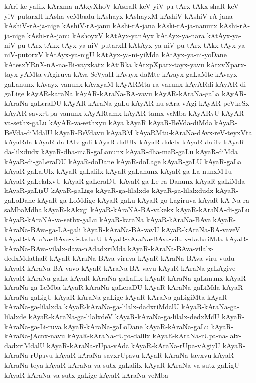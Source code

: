 {kAri-ke-yalilx
kArxma-nAtxyXhoV
kAshaR-keV-yiV-pu-tArx-tAkx-shaR-keV-yiV-putarxH
kAsha-veMbudu
kAshayx
kAshayxM
kAshiV
kAshiV-rA-jana
kAshiV-rA-ja-nige
kAshiV-rA-janu
kAshi-rA-jana
kAshi-rA-ja-nanunx
kAshi-rA-ja-nige
kAshi-rA-janu
kAshoyxV
kAtAyx-yanAyx
kAtAyx-ya-nara
kAtAyx-ya-niV-pu-tArx-tAkx-tAyx-ya-niV-putarxH
kAtAyx-ya-niV-pu-tArx-tAkx-tAyx-ya-niV-putorxV
kAtAyx-ya-nigU
kAtAyx-ya-ni-yiMda
kAtAyx-ya-ni-yoDane
kAtesxYRnX-nA-na-Bi-vayxkatx
kAtiRka
kAtxpXparx-tayx-yavu
kAtxvXparx-tayx-yAMta-vAgiruva
kAva-SeVyaH
kAvayx-daMte
kAvayx-gaLaMte
kAvayx-gaLanunx
kAvayx-vanunx
kAvxyaM
kAyARMta-ra-vanunx
kAyARdi
kAyAR-di-gaLige
kAyAR-karaNa
kAyAR-kAraNa-BA-vavu
kAyAR-kAraNa-gaLa
kAyAR-kAraNa-gaLeraDU
kAyAR-kAraNa-gaLu
kAyAR-nu-sAra-vAgi
kAyAR-peVkeSx
kAyAR-savxrUpa-vanunx
kAyARtamx
kAyAR-tamx-veMba
kAyARvU
kAyAR-va-sethx-gaLu
kAyAR-va-sethxyu
kAya
kAyaR
kAyaR-BeVda-diMda
kAyaR-BeVda-diMdalU
kAyaR-BeVdavu
kAyaRM
kAyaRMtu-kAraNa-dAvx-reV-teyxVta
kAyaRda
kAyaR-da-lAlx-gali
kAyaR-dalUlx
kAyaR-dalelx
kAyaR-dalilx
kAyaR-da-lilxdudx
kAyaR-dha-maR-gaLanunx
kAyaR-dha-maR-gaLu
kAyaR-diMda
kAyaR-di-gaLeraDU
kAyaR-doDane
kAyaR-doLage
kAyaR-gaLU
kAyaR-gaLa
kAyaR-gaLalUlx
kAyaR-gaLalilx
kAyaR-gaLanunx
kAyaR-ga-La-nunxMTu
kAyaR-gaLelalxvU
kAyaR-gaLeraDU
kAyaR-ga-Le-ra-Danunx
kAyaR-gaLiMda
kAyaR-gaLigU
kAyaR-gaLige
kAyaR-ga-lilalxde
kAyaR-ga-lilalxdudx
kAyaR-gaLoDane
kAyaR-ga-LoMdige
kAyaR-gaLu
kAyaR-go-Lagiruva
kAyaR-kA-Na-ra-saMbaMdha
kAyaR-kAkxgi
kAyaR-kAraNA-BA-vakekx
kAyaR-kAraNA-di-gaLu
kAyaR-kAraNA-va-sethx-gaLu
kAyaR-karaNa
kAyaR-kAraNa-BAva
kAyaR-kAraNa-BAva-ga-LA-gali
kAyaR-kAraNa-BA-vavU
kAyaR-kAraNa-BA-vaveV
kAyaR-kAraNa-BAva-vi-dadxrU
kAyaR-kAraNa-BAva-vilalx-dadxriMda
kAyaR-kAraNa-BAva-vilalx-dava-nAdadxriMda
kAyaR-kAraNa-BAva-vilalx-dedxMdathaR
kAyaR-kAraNa-BAva-viruva
kAyaR-kAraNa-BAva-viru-vudu
kAyaR-kAraNa-BA-vavo
kAyaR-kAraNa-BA-vavu
kAyaR-kAraNa-gaLAgive
kAyaR-kAraNa-gaLa
kAyaR-kAraNa-gaLalilx
kAyaR-kAraNa-gaLanunx
kAyaR-kAraNa-ga-LeMba
kAyaR-kAraNa-gaLeraDU
kAyaR-kAraNa-gaLiMda
kAyaR-kAraNa-gaLigU
kAyaR-kAraNa-gaLige
kAyaR-kAraNa-gaLigiMta
kAyaR-kAraNa-ga-lilalxda
kAyaR-kAraNa-ga-lilalx-dadxriMdalU
kAyaR-kAraNa-ga-lilalxde
kAyaR-kAraNa-ga-lilalxdeV
kAyaR-kAraNa-ga-lilalx-dedxMdU
kAyaR-kAraNa-ga-Li-ruva
kAyaR-kAraNa-gaLoDane
kAyaR-kAraNa-gaLu
kAyaR-kAraNa-jAcnx-navu
kAyaR-kAraNa-rUpa-dalilx
kAyaR-kAraNa-rUpa-na-lalx-dadxriMdalU
kAyaR-kAraNa-rUpa-vAda
kAyaR-kAraNa-rUpa-vAgiyU
kAyaR-kAraNa-rUpavu
kAyaR-kAraNa-savxrUpavu
kAyaR-kAraNa-tavxvu
kAyaR-kAraNa-teya
kAyaR-kAraNa-va-sutx-gaLalilx
kAyaR-kAraNa-va-sutx-gaLigU
kAyaR-kAraNa-va-sutx-gaLige
kAyaR-kAraNa-veMba
}
